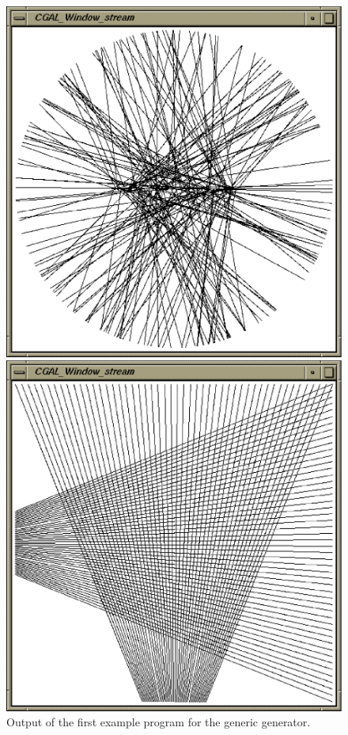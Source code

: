 \begin{ccTexOnly}
  \begin{figure}
    \noindent
    \hspace*{0.025\textwidth}%
    \begin{minipage}[t]{0.45\textwidth}%
      \includegraphics[width=\textwidth]{Segment_generator_prog1.ps}
      \caption{Output of the first example program for the generic generator.}
      \label{figureSegmentGenerator}
    \end{minipage}%
    \hspace*{0.05\textwidth}%
    \begin{minipage}[t]{0.45\textwidth}%
      \includegraphics[width=\textwidth]{Segment_generator_prog2.ps}

\end{minipage}
\end{figure}
\end{ccTexOnly}
